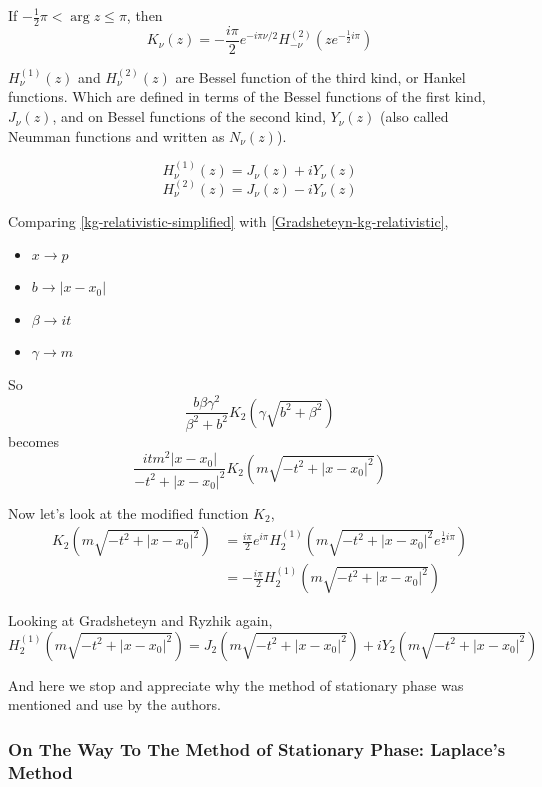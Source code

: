 If $-\frac{1}{2}\pi < \arg{z} \leq \pi$, then
$$
K_\nu (z) = -\frac{i\pi}{2} e^{-i\pi\nu /2} H_{-\nu}^{(2)} \left(z e^{-\frac{1}{2} i\pi} \right)
$$

$H_{\nu}^{(1)} (z)$ and $H_{\nu}^{(2)} (z)$ are Bessel function of the third kind, or Hankel functions.
Which are defined in terms of the Bessel functions of the first kind, $J_{\nu}(z)$, and on Bessel functions
of the second kind, $Y_\nu (z)$ (also called Neumman functions and written as $N_\nu (z)$).

$$
H_{\nu}^{(1)} (z) = J_\nu (z) + i Y_\nu (z)
$$
$$
H_{\nu}^{(2)} (z) = J_\nu (z) - i Y_\nu (z)
$$

Comparing \ref{kg-relativistic-simplified} with \ref{Gradsheteyn-kg-relativistic},
\begin{itemize}
    \item $x \rightarrow p$
    \item $b \rightarrow |x-x_0|$
    \item $\beta \rightarrow it$
    \item $\gamma \rightarrow m$
\end{itemize}

So
$$
\frac{b \beta \gamma^2}{\beta^2 + b^2} K_2\left(\gamma \sqrt{b^2 + \beta^2}\right)
$$
becomes
$$
\frac{it m^2 |x-x_0| }{-t^2 + |x-x_0|^2} K_2\left(m \sqrt{ -t^2 + |x-x_0|^2}\right)
$$

Now let's look at the modified function $K_2$,
\begin{align*}
K_2\left(m \sqrt{ -t^2 + |x-x_0|^2}\right) &=
    \frac{i\pi}{2} e^{i\pi} H_{2}^{(1)} \left(m \sqrt{ -t^2 + |x-x_0|^2} e^{\frac{1}{2} i\pi} \right) \\
    &= - \frac{i\pi}{2} H_{2}^{(1)} \left(m \sqrt{ -t^2 + |x-x_0|^2} \right)
\end{align*}

Looking at Gradsheteyn and Ryzhik again,
$$
H_{2}^{(1)} \left(m \sqrt{ -t^2 + |x-x_0|^2} \right) =
    J_2 \left(m \sqrt{ -t^2 + |x-x_0|^2} \right) + i Y_2 \left(m \sqrt{ -t^2 + |x-x_0|^2} \right)
$$

And here we stop and appreciate why the method of stationary phase was mentioned and use by the authors.

\subsubsection{On The Way To The Method of Stationary Phase: Laplace's Method}

